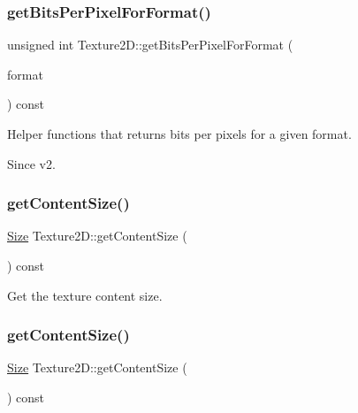 \subsubsection{\texorpdfstring{get\+Bits\+Per\+Pixel\+For\+Format()}{getBitsPerPixelForFormat()}\hspace{0.1cm}{\footnotesize\ttfamily [4/4]}}
{\footnotesize\ttfamily unsigned int Texture2\+D\+::get\+Bits\+Per\+Pixel\+For\+Format (\begin{DoxyParamCaption}\item[{\hyperlink{classTexture2D_a45d9d8bb5a0669def36bbdfbfb91d220}{Texture2\+D\+::\+Pixel\+Format}}]{format }\end{DoxyParamCaption}) const}

Helper functions that returns bits per pixels for a given format. \begin{DoxySince}{Since}
v2. 
\end{DoxySince}
\mbox{\label{classTexture2D_a3ca89213245342676defce5f4124e36b}} 
\subsubsection{\texorpdfstring{get\+Content\+Size()}{getContentSize()}\hspace{0.1cm}{\footnotesize\ttfamily [1/2]}}
{\footnotesize\ttfamily \hyperlink{classSize}{Size} Texture2\+D\+::get\+Content\+Size (\begin{DoxyParamCaption}{ }\end{DoxyParamCaption}) const}

Get the texture content size. \mbox{\label{classTexture2D_a3ca89213245342676defce5f4124e36b}} 
\subsubsection{\texorpdfstring{get\+Content\+Size()}{getContentSize()}\hspace{0.1cm}{\footnotesize\ttfamily [2/2]}}
{\footnotesize\ttfamily \hyperlink{classSize}{Size} Texture2\+D\+::get\+Content\+Size (\begin{DoxyParamCaption}{ }\end{DoxyParamCaption}) const}

